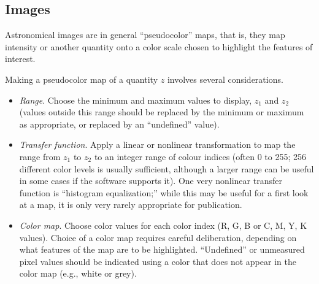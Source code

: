 \documentclass[letterpaper,11pt]{article}
\begin{document}
\subsection{Images}

Astronomical images are in general ``pseudocolor'' maps, that is, they map
intensity or another quantity onto a color scale chosen to highlight the
features of interest.  

Making a pseudocolor map of a quantity $z$ involves several considerations.

\begin{itemize}
\item
{\it Range}. Choose the minimum and maximum values to
display, $z_1$ and $z_2$ (values outside this range should be replaced by the
minimum or maximum as appropriate, or replaced by an ``undefined'' value).

\item
{\it Transfer function\/}. Apply a linear or nonlinear
transformation to map the range from $z_1$ to $z_2$ to an integer range of
colour indices (often 0 to 255; 256 different color levels is usually
sufficient, although a larger range can be useful in some cases if the
software supports it). One very nonlinear transfer function is ``histogram
equalization;'' while this may be useful for  a first look at a map, it is
only very rarely appropriate for publication.

\item
{\it Color map\/}. Choose color values for each color
index (R, G, B or C, M, Y, K values). Choice of a color map requires careful
deliberation, depending on what features of the map are to be highlighted.
``Undefined'' or unmeasured pixel values should be indicated using a color
that does not appear in the color map (e.g., white or grey).

\end{itemize}

%
%
\end{document}
